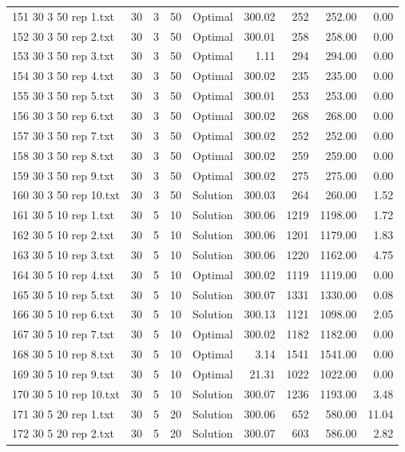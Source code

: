 \begin{longtable}{lrrllrrrr}
151 30 3 50 rep 1.txt & 30 & 3 & 50 & Optimal & 300.02 & 252 & 252.00 &  0.00\\
152 30 3 50 rep 2.txt & 30 & 3 & 50 & Optimal & 300.01 & 258 & 258.00 &  0.00\\
153 30 3 50 rep 3.txt & 30 & 3 & 50 & Optimal &  1.11 & 294 & 294.00 &  0.00\\
154 30 3 50 rep 4.txt & 30 & 3 & 50 & Optimal & 300.02 & 235 & 235.00 &  0.00\\
155 30 3 50 rep 5.txt & 30 & 3 & 50 & Optimal & 300.01 & 253 & 253.00 &  0.00\\
156 30 3 50 rep 6.txt & 30 & 3 & 50 & Optimal & 300.02 & 268 & 268.00 &  0.00\\
157 30 3 50 rep 7.txt & 30 & 3 & 50 & Optimal & 300.02 & 252 & 252.00 &  0.00\\
158 30 3 50 rep 8.txt & 30 & 3 & 50 & Optimal & 300.02 & 259 & 259.00 &  0.00\\
159 30 3 50 rep 9.txt & 30 & 3 & 50 & Optimal & 300.02 & 275 & 275.00 &  0.00\\
160 30 3 50 rep 10.txt & 30 & 3 & 50 & Solution & 300.03 & 264 & 260.00 &  1.52\\
161 30 5 10 rep 1.txt & 30 & 5 & 10 & Solution & 300.06 & 1219 & 1198.00 &  1.72\\
162 30 5 10 rep 2.txt & 30 & 5 & 10 & Solution & 300.06 & 1201 & 1179.00 &  1.83\\
163 30 5 10 rep 3.txt & 30 & 5 & 10 & Solution & 300.06 & 1220 & 1162.00 &  4.75\\
164 30 5 10 rep 4.txt & 30 & 5 & 10 & Optimal & 300.02 & 1119 & 1119.00 &  0.00\\
165 30 5 10 rep 5.txt & 30 & 5 & 10 & Solution & 300.07 & 1331 & 1330.00 &  0.08\\
166 30 5 10 rep 6.txt & 30 & 5 & 10 & Solution & 300.13 & 1121 & 1098.00 &  2.05\\
167 30 5 10 rep 7.txt & 30 & 5 & 10 & Optimal & 300.02 & 1182 & 1182.00 &  0.00\\
168 30 5 10 rep 8.txt & 30 & 5 & 10 & Optimal &  3.14 & 1541 & 1541.00 &  0.00\\
169 30 5 10 rep 9.txt & 30 & 5 & 10 & Optimal & 21.31 & 1022 & 1022.00 &  0.00\\
170 30 5 10 rep 10.txt & 30 & 5 & 10 & Solution & 300.07 & 1236 & 1193.00 &  3.48\\
171 30 5 20 rep 1.txt & 30 & 5 & 20 & Solution & 300.06 & 652 & 580.00 & 11.04\\
172 30 5 20 rep 2.txt & 30 & 5 & 20 & Solution & 300.07 & 603 & 586.00 &  2.82\\

\end{longtable}
